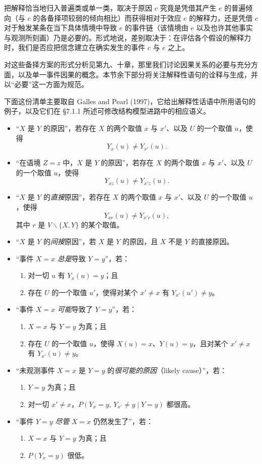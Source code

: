 把解释恰当地归入普遍类或单一类，取决于原因 $c$ 究竟是凭借其产生 $e$ 的普遍倾向（与 $c$ 的各备择项较弱的倾向相比）而获得相对于效应 $e$ 的解释力，还是凭借 $c$ 对于触发某条在当下具体情境中导致 $e$ 的事件链（该情境由 $e$ 以及也许其他事实与观测所刻画）乃是必要的。形式地说，差别取决于：在评估各个假设的解释力时，我们是否应把信念建立在确实发生的事件 $c$ 与 $e$ 之上。

对这些备择方案的形式分析见第九、十章，那里我们讨论因果关系的必要与充分方面，以及单一事件因果的概念。本节余下部分将关注解释性语句的诠释与生成，并以“必要”这一方面为规范。

下面这份清单主要取自 Galles and Pearl (1997)，它给出解释性话语中所用语句的例子，以及它们在 \S 7.1.1 所述可修改结构模型进路中的相应语义。

\begin{itemize}[leftmargin=1.6em,itemsep=0.35em]
\item “$X$ 是 $Y$ 的原因”，若存在 $X$ 的两个取值 $x$ 与 $x'$、以及 $U$ 的一个取值 $u$，使得
\[
Y_x(u)\ne Y_{x'}(u).
\]
\item “在语境 $Z=z$ 中，$X$ 是 $Y$ 的原因”，若存在 $X$ 的两个取值 $x$ 与 $x'$、以及 $U$ 的一个取值 $u$，使得
\[
Y_{xz}(u)\ne Y_{x'z}(u).
\]
\item “$X$ 是 $Y$ 的\emph{直接}原因”，若存在 $X$ 的两个取值 $x$ 与 $x'$、以及 $U$ 的一个取值 $u$，使得
\[
Y_{xr}(u)\ne Y_{x'r}(u),
\]
其中 $r$ 是 $V\backslash\{X,Y\}$ 的某个取值。
\item “$X$ 是 $Y$ 的\emph{间接}原因”，若 $X$ 是 $Y$ 的原因，且 $X$ 不是 $Y$ 的直接原因。
\item “事件 $X=x$ \emph{总是}导致 $Y=y$”，若：
\begin{enumerate}[label=(\roman*),leftmargin=2.0em,itemsep=0.1em]
\item 对一切 $u$ 有 $Y_x(u)=y$；且
\item 存在 $U$ 的一个取值 $u'$，使得对某个 $x'\ne x$ 有 $Y_{x'}(u')\ne y$。
\end{enumerate}
\item “事件 $X=x$ \emph{可能}导致了 $Y=y$”，若：
\begin{enumerate}[label=(\roman*),leftmargin=2.0em,itemsep=0.1em]
\item $X=x$ 与 $Y=y$ 为真；且
\item 存在 $U$ 的一个取值 $u$，使得 $X(u)=x$、$Y(u)=y$，且对某个 $x'\ne x$ 有 $Y_{x'}(u)\ne y$。
\end{enumerate}
\item “未观测事件 $X=x$ 是 $Y=y$ 的\emph{很可能的原因}（likely cause）”，若：
\begin{enumerate}[label=(\roman*),leftmargin=2.0em,itemsep=0.1em]
\item $Y=y$ 为真；且
\item 对一切 $x'\ne x$，$P(Y_x=y,\,Y_{x'}\ne y\mid Y=y)$ 都很高。
\end{enumerate}
\item “事件 $Y=y$ \emph{尽管} $X=x$ 仍然发生了”，若：
\begin{enumerate}[label=(\roman*),leftmargin=2.0em,itemsep=0.1em]
\item $X=x$ 与 $Y=y$ 为真；且
\item $P(Y_x=y)$ 很低。
\end{enumerate}
\end{itemize}

